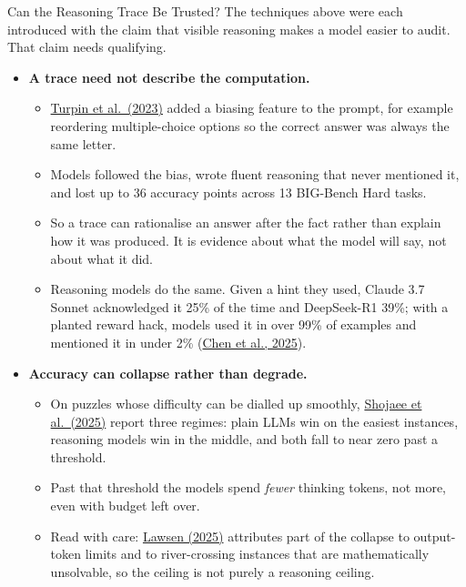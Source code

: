 \begin{frame}[allowframebreaks]{Can the Reasoning Trace Be Trusted?}
    The techniques above were each introduced with the claim that visible reasoning makes a model easier to audit. That claim needs qualifying.
    \vspace{0.5em}
    \begin{itemize}
        \setlength{\itemsep}{0.5em}
        \item \textbf{A trace need not describe the computation.}
        \begin{itemize}
            \item \href{https://arxiv.org/abs/2305.04388}{Turpin et al.\ (2023)} added a biasing feature to the prompt, for example reordering multiple-choice options so the correct answer was always the same letter.
            \item Models followed the bias, wrote fluent reasoning that never mentioned it, and lost up to 36 accuracy points across 13 BIG-Bench Hard tasks.
            \item So a trace can rationalise an answer after the fact rather than explain how it was produced. It is evidence about what the model will say, not about what it did.
            \item Reasoning models do the same. Given a hint they used, Claude 3.7 Sonnet acknowledged it 25\% of the time and DeepSeek-R1 39\%; with a planted reward hack, models used it in over 99\% of examples and mentioned it in under 2\% (\href{https://arxiv.org/abs/2505.05410}{Chen et al., 2025}).
        \end{itemize}
    \framebreak
        \item \textbf{Accuracy can collapse rather than degrade.}
        \begin{itemize}
            \item On puzzles whose difficulty can be dialled up smoothly, \href{https://arxiv.org/abs/2506.06941}{Shojaee et al.\ (2025)} report three regimes: plain LLMs win on the easiest instances, reasoning models win in the middle, and both fall to near zero past a threshold.
            \item Past that threshold the models spend \emph{fewer} thinking tokens, not more, even with budget left over.
            \item Read with care: \href{https://arxiv.org/abs/2506.09250}{Lawsen (2025)} attributes part of the collapse to output-token limits and to river-crossing instances that are mathematically unsolvable, so the ceiling is not purely a reasoning ceiling.

\end{itemize}
\end{itemize}
\end{frame}
